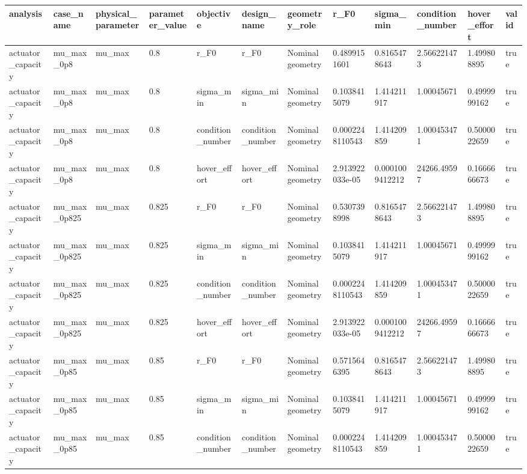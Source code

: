 \begin{tabular}{@{}llllllllllll@{}}
\toprule
analysis & case\_name & physical\_parameter & parameter\_value & objective & design\_name & geometry\_role & r\_F0 & sigma\_min & condition\_number & hover\_effort & valid \\
\midrule
actuator\_capacity & mu\_max\_0p8 & mu\_max & 0.8 & r\_F0 & r\_F0 & Nominal geometry & 0.4899151601 & 0.8165478643 & 2.566221473 & 1.499808895 & true \\
actuator\_capacity & mu\_max\_0p8 & mu\_max & 0.8 & sigma\_min & sigma\_min & Nominal geometry & 0.1038415079 & 1.414211917 & 1.00045671 & 0.4999999162 & true \\
actuator\_capacity & mu\_max\_0p8 & mu\_max & 0.8 & condition\_number & condition\_number & Nominal geometry & 0.0002248110543 & 1.414209859 & 1.000453471 & 0.5000022659 & true \\
actuator\_capacity & mu\_max\_0p8 & mu\_max & 0.8 & hover\_effort & hover\_effort & Nominal geometry & 2.913922033e-05 & 0.0001009412212 & 24266.49597 & 0.1666666673 & true \\
actuator\_capacity & mu\_max\_0p825 & mu\_max & 0.825 & r\_F0 & r\_F0 & Nominal geometry & 0.5307398998 & 0.8165478643 & 2.566221473 & 1.499808895 & true \\
actuator\_capacity & mu\_max\_0p825 & mu\_max & 0.825 & sigma\_min & sigma\_min & Nominal geometry & 0.1038415079 & 1.414211917 & 1.00045671 & 0.4999999162 & true \\
actuator\_capacity & mu\_max\_0p825 & mu\_max & 0.825 & condition\_number & condition\_number & Nominal geometry & 0.0002248110543 & 1.414209859 & 1.000453471 & 0.5000022659 & true \\
actuator\_capacity & mu\_max\_0p825 & mu\_max & 0.825 & hover\_effort & hover\_effort & Nominal geometry & 2.913922033e-05 & 0.0001009412212 & 24266.49597 & 0.1666666673 & true \\
actuator\_capacity & mu\_max\_0p85 & mu\_max & 0.85 & r\_F0 & r\_F0 & Nominal geometry & 0.5715646395 & 0.8165478643 & 2.566221473 & 1.499808895 & true \\
actuator\_capacity & mu\_max\_0p85 & mu\_max & 0.85 & sigma\_min & sigma\_min & Nominal geometry & 0.1038415079 & 1.414211917 & 1.00045671 & 0.4999999162 & true \\
actuator\_capacity & mu\_max\_0p85 & mu\_max & 0.85 & condition\_number & condition\_number & Nominal geometry & 0.0002248110543 & 1.414209859 & 1.000453471 & 0.5000022659 & true \\

\end{tabular}
